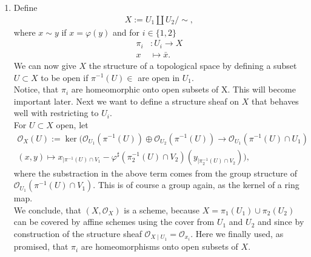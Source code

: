 \begin{exercise}{1}
    \begin{enumerate}
        \item Define 
        \begin{align*}
            X:=U_1\coprod U_2/\!{\sim},
        \end{align*}
        where $x\sim y$ if $x=\varphi(y)$ and for $i\in \lbrace
        1,2\rbrace$
        \begin{align*}
            \pi_i&:U_i\to X\\
            x&\mapsto \bar{x}.
        \end{align*}
        We can now give $X$ the structure of a topological 
        space by defining a subset $U\subset X$ to be open
        if $\pi^{-1}(U)\in$ are open in $U_1$.\\
        Notice, that $\pi_i$ are homeomorphic onto open subsets
        of X. This will become important later.
        Next we want to define a structure sheaf on $X$ that
        behaves well with restricting to $U_i.$\\
        For $U\subset X$ open, let 
        \begin{align*}
            \mathcal{O}_X(U):= \ker (\mathcal{O}_{U_1}(\pi^{-1}(U))\oplus
            \mathcal{O}_{U_2}(\pi^{-1}(U)) \to \mathcal{O}_{U_1}(\pi^{-1}(U)
            \cap U_1)\\ (x,y) \mapsto x_{\mid \pi^{-1}(U)\cap
            V_1}-\varphi^\sharp (\pi_2^{-1}(U)\cap V_2)(y_{\mid
            \pi_2^{-1}(U)\cap V_2}) ),
        \end{align*}
            where the substraction in the above term comes from the group
            structure of $\mathcal{O}_{U_1}(\pi^{-1}(U)\cap V_1)$. This is of course
            a group again, as the kernel of a ring map.\\
            We conclude, that $(X,\mathcal{O}_X)$ is a scheme, because 
            $X=\pi_1(U_1)\cup \pi _2(U_2)$  can be covered by affine
            schemes using the cover from $U_1$ and $U_2$ and since by construction
            of the structure sheaf $\mathcal{O}_{X \mid U_1}=\mathcal{O}_{x_i}.$
            Here we finally used, as promised, that $\pi_i$ are homeomorphisms
            onto open subsets of $X$.
    \end{enumerate}
\end{exercise}
